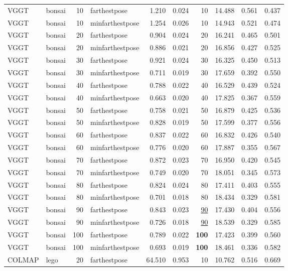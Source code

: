 \begin{table}[H]
\begin{tabular}{llrlrrrrrr}
VGGT & bonsai & 10 & farthestpose & 1.210 & 0.024 & 10 & 14.488 & 0.561 & 0.437 \\
VGGT & bonsai & 10 & minfarthestpose & 1.254 & 0.026 & 10 & 14.943 & 0.521 & 0.474 \\
VGGT & bonsai & 20 & farthestpose & 0.904 & 0.024 & 20 & 16.241 & 0.465 & 0.501 \\
VGGT & bonsai & 20 & minfarthestpose & 0.886 & 0.021 & 20 & 16.856 & 0.427 & 0.525 \\
VGGT & bonsai & 30 & farthestpose & 0.921 & 0.024 & 30 & 16.325 & 0.450 & 0.513 \\
VGGT & bonsai & 30 & minfarthestpose & 0.711 & 0.019 & 30 & 17.659 & 0.392 & 0.550 \\
VGGT & bonsai & 40 & farthestpose & 0.788 & 0.022 & 40 & 16.529 & 0.439 & 0.524 \\
VGGT & bonsai & 40 & minfarthestpose & 0.663 & 0.020 & 40 & 17.825 & 0.367 & 0.559 \\
VGGT & bonsai & 50 & farthestpose & 0.758 & 0.021 & 50 & 16.879 & 0.425 & 0.536 \\
VGGT & bonsai & 50 & minfarthestpose & 0.828 & 0.019 & 50 & 17.599 & 0.377 & 0.556 \\
VGGT & bonsai & 60 & farthestpose & 0.837 & 0.022 & 60 & 16.832 & 0.426 & 0.540 \\
VGGT & bonsai & 60 & minfarthestpose & 0.776 & 0.020 & 60 & 17.887 & 0.355 & 0.567 \\
VGGT & bonsai & 70 & farthestpose & 0.872 & 0.023 & 70 & 16.950 & 0.420 & 0.545 \\
VGGT & bonsai & 70 & minfarthestpose & 0.749 & 0.020 & 70 & 18.051 & 0.345 & 0.573 \\
VGGT & bonsai & 80 & farthestpose & 0.824 & 0.024 & 80 & 17.411 & 0.403 & 0.555 \\
VGGT & bonsai & 80 & minfarthestpose & 0.701 & 0.018 & 80 & 18.434 & 0.329 & 0.581 \\
VGGT & bonsai & 90 & farthestpose & 0.843 & 0.023 & \underline{90} & 17.430 & 0.404 & 0.556 \\
VGGT & bonsai & 90 & minfarthestpose & 0.726 & 0.018 & \underline{90} & 18.539 & 0.329 & 0.585 \\
VGGT & bonsai & 100 & farthestpose & 0.789 & 0.022 & \textbf{100} & 17.423 & 0.399 & 0.560 \\
VGGT & bonsai & 100 & minfarthestpose & 0.693 & 0.019 & \textbf{100} & 18.461 & 0.336 & 0.582 \\
\midrule
COLMAP & lego & 20 & farthestpose & 64.510 & 0.953 & 10 & 10.762 & 0.516 & 0.669 \\

\end{tabular}
\end{table}
